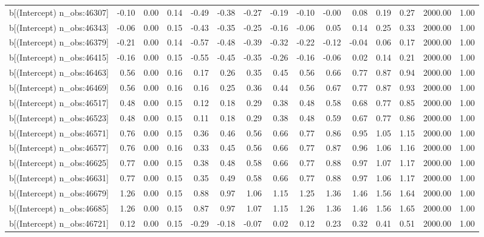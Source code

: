 \begin{table}[ht]
\begin{tabular}{rrrrrrrrrrrrrrr}
  b[(Intercept) n\_obs:46307] & -0.10 & 0.00 & 0.14 & -0.49 & -0.38 & -0.27 & -0.19 & -0.10 & -0.00 & 0.08 & 0.19 & 0.27 & 2000.00 & 1.00 \\ 
  b[(Intercept) n\_obs:46343] & -0.06 & 0.00 & 0.15 & -0.43 & -0.35 & -0.25 & -0.16 & -0.06 & 0.05 & 0.14 & 0.25 & 0.33 & 2000.00 & 1.00 \\ 
  b[(Intercept) n\_obs:46379] & -0.21 & 0.00 & 0.14 & -0.57 & -0.48 & -0.39 & -0.32 & -0.22 & -0.12 & -0.04 & 0.06 & 0.17 & 2000.00 & 1.00 \\ 
  b[(Intercept) n\_obs:46415] & -0.16 & 0.00 & 0.15 & -0.55 & -0.45 & -0.35 & -0.26 & -0.16 & -0.06 & 0.02 & 0.14 & 0.21 & 2000.00 & 1.00 \\ 
  b[(Intercept) n\_obs:46463] & 0.56 & 0.00 & 0.16 & 0.17 & 0.26 & 0.35 & 0.45 & 0.56 & 0.66 & 0.77 & 0.87 & 0.94 & 2000.00 & 1.00 \\ 
  b[(Intercept) n\_obs:46469] & 0.56 & 0.00 & 0.16 & 0.16 & 0.25 & 0.36 & 0.44 & 0.56 & 0.67 & 0.77 & 0.87 & 0.93 & 2000.00 & 1.00 \\ 
  b[(Intercept) n\_obs:46517] & 0.48 & 0.00 & 0.15 & 0.12 & 0.18 & 0.29 & 0.38 & 0.48 & 0.58 & 0.68 & 0.77 & 0.85 & 2000.00 & 1.00 \\ 
  b[(Intercept) n\_obs:46523] & 0.48 & 0.00 & 0.15 & 0.11 & 0.18 & 0.29 & 0.38 & 0.48 & 0.59 & 0.67 & 0.77 & 0.86 & 2000.00 & 1.00 \\ 
  b[(Intercept) n\_obs:46571] & 0.76 & 0.00 & 0.15 & 0.36 & 0.46 & 0.56 & 0.66 & 0.77 & 0.86 & 0.95 & 1.05 & 1.15 & 2000.00 & 1.00 \\ 
  b[(Intercept) n\_obs:46577] & 0.76 & 0.00 & 0.16 & 0.33 & 0.45 & 0.56 & 0.66 & 0.77 & 0.87 & 0.96 & 1.06 & 1.16 & 2000.00 & 1.00 \\ 
  b[(Intercept) n\_obs:46625] & 0.77 & 0.00 & 0.15 & 0.38 & 0.48 & 0.58 & 0.66 & 0.77 & 0.88 & 0.97 & 1.07 & 1.17 & 2000.00 & 1.00 \\ 
  b[(Intercept) n\_obs:46631] & 0.77 & 0.00 & 0.15 & 0.35 & 0.49 & 0.58 & 0.66 & 0.77 & 0.88 & 0.97 & 1.06 & 1.17 & 2000.00 & 1.00 \\ 
  b[(Intercept) n\_obs:46679] & 1.26 & 0.00 & 0.15 & 0.88 & 0.97 & 1.06 & 1.15 & 1.25 & 1.36 & 1.46 & 1.56 & 1.64 & 2000.00 & 1.00 \\ 
  b[(Intercept) n\_obs:46685] & 1.26 & 0.00 & 0.15 & 0.87 & 0.97 & 1.07 & 1.15 & 1.26 & 1.36 & 1.46 & 1.56 & 1.65 & 2000.00 & 1.00 \\ 
  b[(Intercept) n\_obs:46721] & 0.12 & 0.00 & 0.15 & -0.29 & -0.18 & -0.07 & 0.02 & 0.12 & 0.23 & 0.32 & 0.41 & 0.51 & 2000.00 & 1.00 \\ 

\end{tabular}
\end{table}
